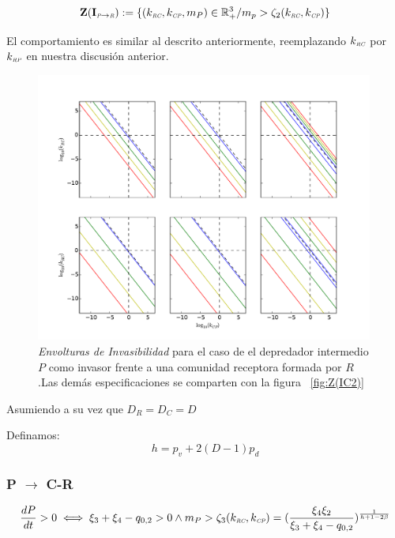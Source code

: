 \begin{equation}
\mathbf{Z(I_{\textit{\tiny P} \to \textit{\tiny R}})} := \{ (k_{\textit{\tiny RC}},k_{\textit{\tiny CP}},m_P) \in \mathbb{R}^3_+ / m_p > \zeta_2(k_{\textit{\tiny RC}},k_{\textit{\tiny CP}}) \}
\end{equation}

El comportamiento es similar al descrito anteriormente, reemplazando $k_{\textit{\tiny RC}}$ por $k_{\textit{\tiny RP}}$ en nuestra discusi\'on anterior.


\begin{figure}
  \centering
  \includegraphics[width = 0.99\textwidth]{./Plots/Z(IC3)AcGrGr.pdf}
  \caption[Env $Z(IC2)$]{\emph{Envolturas de Invasibilidad} para el caso de el depredador intermedio $P$ como invasor frente a una comunidad receptora formada por $R$.Las dem\'as especificaciones se comparten con la figura ~\ref{fig:Z(IC2)}}
  \label{fig:Z(IC3)}
\end{figure}


Asumiendo a su vez que $D_R = D_C = D$

Definamos:
\begin{equation}
  h = p_v + 2(D-1)p_d
\end{equation}

\subsubsection{P $\to$ C-R}
\begin{equation}
  \frac{dP}{dt}  >0 \iff \xi_3 + \xi_4 - q_{0,2} >0 \land m_P > \zeta_3(k_{\textit{\tiny RC}},k_{\textit{\tiny CP}}) = (\frac{\xi_4\xi_2}{\xi_3 + \xi_4 - q_{0,2}})^{\frac{1}{h + 1 - 2\beta}}
\end{equation}

